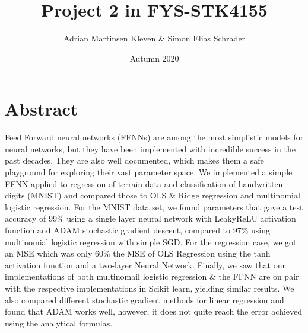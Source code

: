 \documentclass[11pt,a4paper,titlepage]{article}
\title{Project 2 in FYS-STK4155}
\author{Adrian Martinsen Kleven & Simon Elias Schrader }
\date{Autumn 2020}
\begin{document}
\tableofcontents
\listoffigures
\listoftables

\clearpage
\section{Abstract}
Feed Forward neural networks (FFNNs) are among the most simplistic models for neural networks, but they have been implemented with incredible success in the past decades. They are also well documented, which makes them a safe playground for exploring their vast parameter space. We implemented a simple FFNN applied to regression of terrain data \citep{Project1} and classification of handwritten digits (MNIST) \citep{lecun2010mnist} and compared those to OLS \& Ridge regression and multinomial logistic regression. For the MNIST data set, we found parameters that gave a test accuracy of 99\% using a single layer neural network with LeakyReLU activation function and ADAM stochastic gradient descent, compared to 97\% using multinomial logistic regression with simple SGD. For the regression case, we got an MSE which was only 60\% the MSE of OLS Regression using the tanh activation function and a two-layer Neural Network. Finally, we saw that our implementations of both multinomail logistic regression \& the FFNN are on pair with the respective implementations in Scikit learn, yielding similar results. We also compared different stochastic gradient methods for linear regression and found that ADAM works well, however, it does not quite reach the error achieved using the analytical formulas. 
\end{document}
